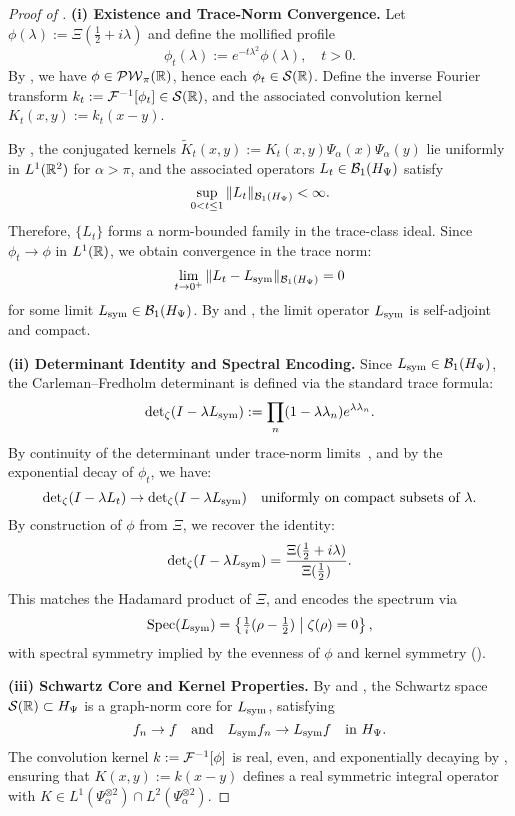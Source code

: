 \begin{proof}[Proof of ]
\textbf{(i) Existence and Trace-Norm Convergence.}
Let \( \phi(\lambda) := \Xi(\tfrac{1}{2} + i\lambda) \) and define the mollified profile
\[
\phi_t(\lambda) := e^{-t\lambda^2} \phi(\lambda), \quad t > 0.
\]
By , we have \( \phi \in \mathcal{PW}_{\pi}(\mathbb{R}) \), hence each \( \phi_t \in \mathcal{S}(\mathbb{R}) \). Define the inverse Fourier transform \( k_t := \mathcal{F}^{-1}[\phi_t] \in \mathcal{S}(\mathbb{R}) \), and the associated convolution kernel \( K_t(x,y) := k_t(x - y) \).

By , the conjugated kernels \( \widetilde{K}_t(x,y) := K_t(x,y) \Psi_\alpha(x) \Psi_\alpha(y) \) lie uniformly in \( L^1(\mathbb{R}^2) \) for \( \alpha > \pi \), and the associated operators \( L_t \in \mathcal{B}_1(H_{\Psi}) \) satisfy
\[
\sup_{0 < t \le 1} \| L_t \|_{\mathcal{B}_1(H_{\Psi})} < \infty.
\]
Therefore, \( \{L_t\} \) forms a norm-bounded family in the trace-class ideal. Since \( \phi_t \to \phi \) in \( L^1(\mathbb{R}) \), we obtain convergence in the trace norm:
\[
\lim_{t \to 0^+} \| L_t - L_{\mathrm{sym}} \|_{\mathcal{B}_1(H_{\Psi})} = 0
\]
for some limit \( L_{\mathrm{sym}} \in \mathcal{B}_1(H_{\Psi}) \). By  and , the limit operator \( L_{\mathrm{sym}} \) is self-adjoint and compact.

\medskip
\noindent\textbf{(ii) Determinant Identity and Spectral Encoding.}
Since \( L_{\mathrm{sym}} \in \mathcal{B}_1(H_{\Psi}) \), the Carleman--Fredholm determinant is defined via the standard trace formula:
\[
\det\nolimits_{\zeta}(I - \lambda L_{\mathrm{sym}}) := \prod_n (1 - \lambda \lambda_n) e^{\lambda \lambda_n}.
\]
By continuity of the determinant under trace-norm limits~\cite[Ch.~4]{Simon2005TraceIdeals}, and by the exponential decay of \( \phi_t \), we have:
\[
\det\nolimits_{\zeta}(I - \lambda L_t) \to \det\nolimits_{\zeta}(I - \lambda L_{\mathrm{sym}}) \quad \text{uniformly on compact subsets of } \lambda.
\]
By construction of \( \phi \) from \( \Xi \), we recover the identity:
\[
\det\nolimits_{\zeta}(I - \lambda L_{\mathrm{sym}}) = \frac{\Xi(\tfrac{1}{2} + i\lambda)}{\Xi(\tfrac{1}{2})}.
\]
This matches the Hadamard product of \( \Xi \), and encodes the spectrum via
\[
\operatorname{Spec}(L_{\mathrm{sym}}) = \left\{ \tfrac{1}{i}(\rho - \tfrac{1}{2}) \;\middle|\; \zeta(\rho) = 0 \right\},
\]
with spectral symmetry implied by the evenness of \( \phi \) and kernel symmetry ().

\medskip
\noindent\textbf{(iii) Schwartz Core and Kernel Properties.}
By  and , the Schwartz space \( \mathcal{S}(\mathbb{R}) \subset H_{\Psi} \) is a graph-norm core for \( L_{\mathrm{sym}} \), satisfying
\[
f_n \to f \quad \text{and} \quad L_{\mathrm{sym}} f_n \to L_{\mathrm{sym}} f \quad \text{in } H_{\Psi}.
\]
The convolution kernel \( k := \mathcal{F}^{-1}[\phi] \) is real, even, and exponentially decaying by , ensuring that \( K(x,y) := k(x - y) \) defines a real symmetric integral operator with \( K \in L^1(\Psi_\alpha^{\otimes 2}) \cap L^2(\Psi_\alpha^{\otimes 2}) \).


\end{proof}
